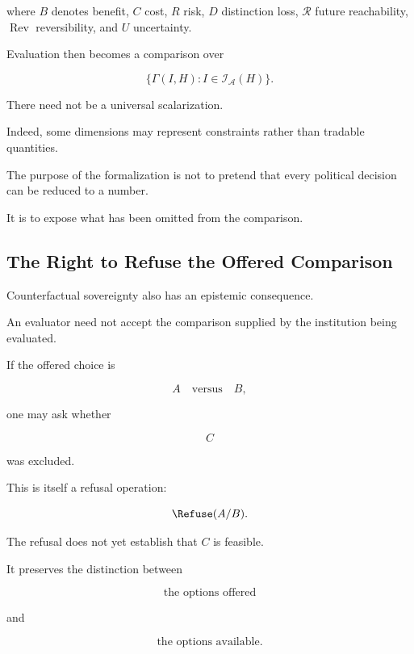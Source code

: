 \documentclass[11pt]{article}
\theoremstyle{remark}
\newcommand{\Adm}{\mathcal{A}}
\newcommand{\Reach}{\mathcal{R}}
\begin{document}
where $B$ denotes benefit, $C$ cost, $R$ risk, $D$ distinction loss, $\Reach$ future reachability, $\operatorname{Rev}$ reversibility, and $U$ uncertainty.

Evaluation then becomes a comparison over

\begin{equation}
\{
\Gamma(I,H):
I\in\mathcal{I}_{\Adm}(H)
\}.
\end{equation}

There need not be a universal scalarization.

Indeed, some dimensions may represent constraints rather than tradable quantities.

The purpose of the formalization is not to pretend that every political decision can be reduced to a number.

It is to expose what has been omitted from the comparison.

\subsection{The Right to Refuse the Offered Comparison}

Counterfactual sovereignty also has an epistemic consequence.

An evaluator need not accept the comparison supplied by the institution being evaluated.

If the offered choice is

\begin{equation}
A
\quad\text{versus}\quad
B,
\end{equation}

one may ask whether

\begin{equation}
C
\end{equation}

was excluded.

This is itself a refusal operation:

\begin{equation}
\Refuse(A/B).
\end{equation}

The refusal does not yet establish that $C$ is feasible.

It preserves the distinction between

\begin{equation}
\text{the options offered}
\end{equation}

and

\begin{equation}
\text{the options available}.
\end{equation}
\end{document}

